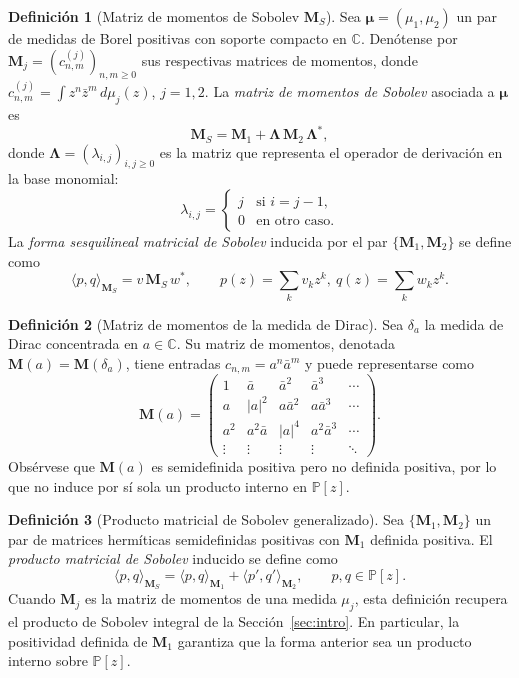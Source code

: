 \documentclass[12pt,a4paper]{article}
\theoremstyle{definition}
\newtheorem{definition}{Definición}
\theoremstyle{remark}
\begin{document}
\begin{definition}[Matriz de momentos de Sobolev $\mathbf{M}_S$]\label{def:matriz_sobolev}
	Sea $\boldsymbol{\mu} = (\mu_1, \mu_2)$ un par de medidas de Borel positivas con soporte compacto en $\mathbb{C}$. Denótense por $\mathbf{M}_j = (c^{(j)}_{n,m})_{n,m \geq 0}$ sus respectivas matrices de momentos, donde $c^{(j)}_{n,m} = \int z^n \bar{z}^m \, d\mu_j(z)$, $j = 1, 2$. La \emph{matriz de momentos de Sobolev} asociada a $\boldsymbol{\mu}$ es
	\[
		\mathbf{M}_S = \mathbf{M}_1 + \boldsymbol{\Lambda}\, \mathbf{M}_2\, \boldsymbol{\Lambda}^*,
	\]
	donde $\boldsymbol{\Lambda} = (\lambda_{i,j})_{i,j \geq 0}$ es la matriz que representa el operador de derivación en la base monomial:
	\[
		\lambda_{i,j} = \begin{cases} j & \text{si } i = j - 1, \\ 0 & \text{en otro caso.} \end{cases}
	\]
	La \emph{forma sesquilineal matricial de Sobolev} inducida por el par $\{\mathbf{M}_1, \mathbf{M}_2\}$ se define como
	\[
		\langle p, q \rangle_{\mathbf{M}_S} = v\, \mathbf{M}_S\, w^*, \qquad p(z) = \sum_k v_k z^k,\ q(z) = \sum_k w_k z^k.
	\]
\end{definition}

\begin{definition}[Matriz de momentos de la medida de Dirac]\label{def:matriz_dirac}
	Sea $\delta_a$ la medida de Dirac concentrada en $a \in \mathbb{C}$. Su matriz de momentos, denotada $\mathbf{M}(a) = \mathbf{M}(\delta_a)$, tiene entradas $c_{n,m} = a^n \bar{a}^m$ y puede representarse como
	\[
		\mathbf{M}(a) = \begin{pmatrix}
			1      & \bar{a}    & \bar{a}^2  & \bar{a}^3    & \cdots \\
			a      & |a|^2      & a\bar{a}^2 & a\bar{a}^3   & \cdots \\
			a^2    & a^2\bar{a} & |a|^4      & a^2\bar{a}^3 & \cdots \\
			\vdots & \vdots     & \vdots     & \vdots       & \ddots
		\end{pmatrix}.
	\]
	Obsérvese que $\mathbf{M}(a)$ es semidefinida positiva pero no definida positiva, por lo que no induce por sí sola un producto interno en $\mathbb{P}[z]$.
\end{definition}

\begin{definition}[Producto matricial de Sobolev generalizado]\label{def:producto_sobolev_matricial}
	Sea $\{\mathbf{M}_1, \mathbf{M}_2\}$ un par de matrices hermíticas semidefinidas positivas con $\mathbf{M}_1$ definida positiva. El \emph{producto matricial de Sobolev} inducido se define como
	\[
		\langle p, q \rangle_{\mathbf{M}_S} = \langle p, q \rangle_{\mathbf{M}_1} + \langle p', q' \rangle_{\mathbf{M}_2}, \qquad p, q \in \mathbb{P}[z].
	\]
	Cuando $\mathbf{M}_j$ es la matriz de momentos de una medida $\mu_j$, esta definición recupera el producto de Sobolev integral de la Sección~\ref{sec:intro}. En particular, la positividad definida de $\mathbf{M}_1$ garantiza que la forma anterior sea un producto interno sobre $\mathbb{P}[z]$.
\end{definition}
\end{document}

